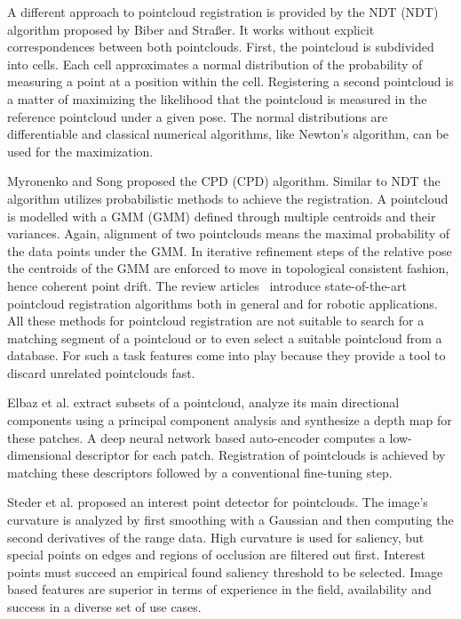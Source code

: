 A different approach to pointcloud registration is provided by the \acrlong{NDT} (\acrshort{NDT}) algorithm proposed by Biber and Straßer\cite{biber_iros2003}.
It works without explicit correspondences between both pointclouds.
First, the pointcloud is subdivided into cells.
Each cell approximates a normal distribution of the probability of measuring a point at a position within the cell.
Registering a second pointcloud is a matter of maximizing the likelihood that the pointcloud is measured in the reference pointcloud under a given pose.
The normal distributions are differentiable and classical numerical algorithms, like Newton's algorithm, can be used for the maximization.

Myronenko and Song\cite{myronenko_ieee2010} proposed the \acrlong{CPD} (\acrshort{CPD}) algorithm.
Similar to \acrshort{NDT} the algorithm utilizes probabilistic methods to achieve the registration.
A pointcloud is modelled with a \acrlong{GMM} (\acrshort{GMM}) defined through multiple centroids and their variances.
Again, alignment of two pointclouds means the maximal probability of the data points under the \acrshort{GMM}.
In iterative refinement steps of the relative pose the centroids of the \acrshort{GMM} are enforced to move in topological consistent fashion, hence coherent point drift.
The review articles~\cite{bellekens_ambient2014,pomerleau_2015} introduce state-of-the-art pointcloud registration algorithms both in general and for robotic applications.
All these methods for pointcloud registration are not suitable to search for a matching segment of a pointcloud or to even select a suitable pointcloud from a database.
For such a task features come into play because they provide a tool to discard unrelated pointclouds fast.

Elbaz et al.\cite{elbaz_cvpr2017} extract subsets of a pointcloud, analyze its main directional components using a principal component analysis and synthesize a depth map for these patches.
A deep neural network based auto-encoder computes a low-dimensional descriptor for each patch.
Registration of pointclouds is achieved by matching these descriptors followed by a conventional fine-tuning step.

Steder et al.\cite{steder_robot2010} proposed an interest point detector for pointclouds.
The image's curvature is analyzed by first smoothing with a Gaussian and then computing the second derivatives of the range data.
High curvature is used for saliency, but special points on edges and regions of occlusion are filtered out first.
Interest points must succeed an empirical found saliency threshold to be selected.
Image based features are superior in terms of experience in the field, availability and success in a diverse set of use cases\cite{lynen_ros2015,sivic_pami2009,aqel_2016}.


